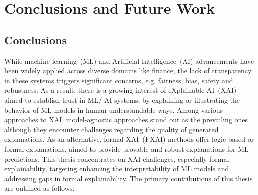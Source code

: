 \chapter{Conclusions and Future Work}\label{chap:conc}

\section*{Conclusions}

%

While machine learning~(ML) and Artificial Intelligence~(AI) advancements have been 
widely applied across diverse domains like finance, 
the lack of transparency in these systems triggers significant concerns, 
e.g. fairness, bias, safety and robustness.
%
As a result, there is a growing interest of eXplainable AI~(XAI) aimed to establish trust in ML/ AI 
systems, by explaining or illustrating the behavior of ML models in 
human-understandable ways.
%
Among various approaches to XAI, model-agnostic approaches
stand out as the prevailing ones although they encounter challenges regarding 
the quality of generated explanations. 
%
As an alternative, formal XAI~(FXAI) methods offer logic-based or formal explanations, 
aimed to provide provable and robust explanations for ML predictions.
%
This thesis concentrates on XAI challenges, especially formal explainability,
targeting enhancing the interpretability of ML models
and addressing gaps in formal explainability.
%
The primary contributions of this thesis are outlined as follows:

